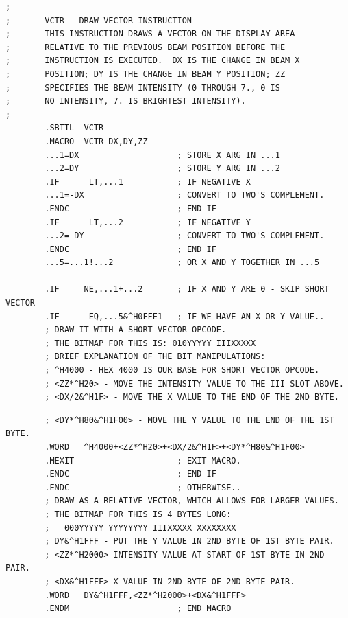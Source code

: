 \begin{lstlisting}
;
;       VCTR - DRAW VECTOR INSTRUCTION
;       THIS INSTRUCTION DRAWS A VECTOR ON THE DISPLAY AREA
;       RELATIVE TO THE PREVIOUS BEAM POSITION BEFORE THE
;       INSTRUCTION IS EXECUTED.  DX IS THE CHANGE IN BEAM X
;       POSITION; DY IS THE CHANGE IN BEAM Y POSITION; ZZ 
;       SPECIFIES THE BEAM INTENSITY (0 THROUGH 7., 0 IS
;       NO INTENSITY, 7. IS BRIGHTEST INTENSITY).
;
        .SBTTL  VCTR
        .MACRO  VCTR DX,DY,ZZ
        ...1=DX                    ; STORE X ARG IN ...1
        ...2=DY                    ; STORE Y ARG IN ...2
        .IF      LT,...1           ; IF NEGATIVE X
        ...1=-DX                   ; CONVERT TO TWO'S COMPLEMENT.
        .ENDC                      ; END IF
        .IF      LT,...2           ; IF NEGATIVE Y
        ...2=-DY                   ; CONVERT TO TWO'S COMPLEMENT.
        .ENDC                      ; END IF
        ...5=...1!...2             ; OR X AND Y TOGETHER IN ...5
    
        .IF     NE,...1+...2       ; IF X AND Y ARE 0 - SKIP SHORT VECTOR
        .IF      EQ,...5&^H0FFE1   ; IF WE HAVE AN X OR Y VALUE..
        ; DRAW IT WITH A SHORT VECTOR OPCODE.
        ; THE BITMAP FOR THIS IS: 010YYYYY IIIXXXXX
        ; BRIEF EXPLANATION OF THE BIT MANIPULATIONS:
        ; ^H4000 - HEX 4000 IS OUR BASE FOR SHORT VECTOR OPCODE.
        ; <ZZ*^H20> - MOVE THE INTENSITY VALUE TO THE III SLOT ABOVE.
        ; <DX/2&^H1F> - MOVE THE X VALUE TO THE END OF THE 2ND BYTE.
\end{lstlisting}
\begin{lstlisting}
        ; <DY*^H80&^H1F00> - MOVE THE Y VALUE TO THE END OF THE 1ST BYTE.
        .WORD   ^H4000+<ZZ*^H20>+<DX/2&^H1F>+<DY*^H80&^H1F00>
        .MEXIT                     ; EXIT MACRO.
        .ENDC                      ; END IF
        .ENDC                      ; OTHERWISE..
        ; DRAW AS A RELATIVE VECTOR, WHICH ALLOWS FOR LARGER VALUES.
        ; THE BITMAP FOR THIS IS 4 BYTES LONG:
        ;   000YYYYY YYYYYYYY IIIXXXXX XXXXXXXX
        ; DY&^H1FFF - PUT THE Y VALUE IN 2ND BYTE OF 1ST BYTE PAIR.
        ; <ZZ*^H2000> INTENSITY VALUE AT START OF 1ST BYTE IN 2ND PAIR.
        ; <DX&^H1FFF> X VALUE IN 2ND BYTE OF 2ND BYTE PAIR.
        .WORD   DY&^H1FFF,<ZZ*^H2000>+<DX&^H1FFF>
        .ENDM                      ; END MACRO
\end{lstlisting}
